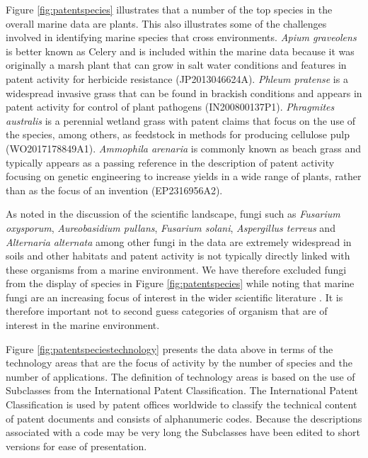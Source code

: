 \documentclass[]{book}
\theoremstyle{definition}
\theoremstyle{definition}
\theoremstyle{definition}
\theoremstyle{remark}
\begin{document}
Figure \ref{fig:patentspecies} illustrates that a number of the top
species in the overall marine data are plants. This also illustrates
some of the challenges involved in identifying marine species that cross
environments. \emph{Apium graveolens} is better known as Celery and is
included within the marine data because it was originally a marsh plant
that can grow in salt water conditions and features in patent activity
for herbicide resistance (JP2013046624A). \emph{Phleum pratense} is a
widespread invasive grass that can be found in brackish conditions and
appears in patent activity for control of plant pathogens
(IN200800137P1). \emph{Phragmites australis} is a perennial wetland
grass with patent claims that focus on the use of the species, among
others, as feedstock in methods for producing cellulose pulp
(WO2017178849A1). \emph{Ammophila arenaria} is commonly known as beach
grass and typically appears as a passing reference in the description of
patent activity focusing on genetic engineering to increase yields in a
wide range of plants, rather than as the focus of an invention
(EP2316956A2).

As noted in the discussion of the scientific landscape, fungi such as
\emph{Fusarium oxysporum}, \emph{Aureobasidium pullans}, \emph{Fusarium
solani}, \emph{Aspergillus terreus} and \emph{Alternaria alternata}
among other fungi in the data are extremely widespread in soils and
other habitats and patent activity is not typically directly linked with
these organisms from a marine environment. We have therefore excluded
fungi from the display of species in Figure \ref{fig:patentspecies}
while noting that marine fungi are an increasing focus of interest in
the wider scientific literature \citep[see for example,][]{Kim_2012}. It
is therefore important not to second guess categories of organism that
are of interest in the marine environment.

Figure \ref{fig:patentspeciestechnology} presents the data above in
terms of the technology areas that are the focus of activity by the
number of species and the number of applications. The definition of
technology areas is based on the use of Subclasses from the
International Patent Classification. The International Patent
Classification is used by patent offices worldwide to classify the
technical content of patent documents and consists of alphanumeric
codes. Because the descriptions associated with a code may be very long
the Subclasses have been edited to short versions for ease of
presentation.
\end{document}
